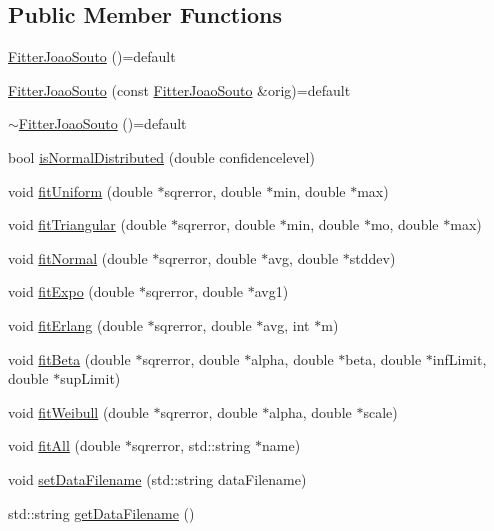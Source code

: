 \subsection*{Public Member Functions}
\begin{DoxyCompactItemize}
\item 
\hyperlink{class_fitter_joao_souto_a30255d1f0611a9fdf64f64d15fd1be5a}{Fitter\-Joao\-Souto} ()=default
\item 
\hyperlink{class_fitter_joao_souto_a82e673f80988f863f01e5eef8a2c95cb}{Fitter\-Joao\-Souto} (const \hyperlink{class_fitter_joao_souto}{Fitter\-Joao\-Souto} \&orig)=default
\item 
\hyperlink{class_fitter_joao_souto_a3956ef306f13b3cc912d3f69960729c9}{$\sim$\-Fitter\-Joao\-Souto} ()=default
\item 
bool \hyperlink{class_fitter_joao_souto_a653081d38fc10cfcd9e8f5bb7ff81e9a}{is\-Normal\-Distributed} (double confidencelevel)
\item 
void \hyperlink{class_fitter_joao_souto_ae22eb8c3c56c8b1253261652ae5ad152}{fit\-Uniform} (double $\ast$sqrerror, double $\ast$min, double $\ast$max)
\item 
void \hyperlink{class_fitter_joao_souto_a3cea6d756de4931b2b395e49b29230c9}{fit\-Triangular} (double $\ast$sqrerror, double $\ast$min, double $\ast$mo, double $\ast$max)
\item 
void \hyperlink{class_fitter_joao_souto_a7ca82959fcf03884eaeac57367a04959}{fit\-Normal} (double $\ast$sqrerror, double $\ast$avg, double $\ast$stddev)
\item 
void \hyperlink{class_fitter_joao_souto_a212f66a0787f7dd007675d3160428f2e}{fit\-Expo} (double $\ast$sqrerror, double $\ast$avg1)
\item 
void \hyperlink{class_fitter_joao_souto_a0fa377ecaf5240192875db081268c1f2}{fit\-Erlang} (double $\ast$sqrerror, double $\ast$avg, int $\ast$m)
\item 
void \hyperlink{class_fitter_joao_souto_a9ab8de1bbf179c05e57e54ec101a0b1a}{fit\-Beta} (double $\ast$sqrerror, double $\ast$alpha, double $\ast$beta, double $\ast$inf\-Limit, double $\ast$sup\-Limit)
\item 
void \hyperlink{class_fitter_joao_souto_a4a3175a5d6d8c96baf2658e5f7837d99}{fit\-Weibull} (double $\ast$sqrerror, double $\ast$alpha, double $\ast$scale)
\item 
void \hyperlink{class_fitter_joao_souto_a83e95985c9bc5d419803b12a572ac743}{fit\-All} (double $\ast$sqrerror, std\-::string $\ast$name)
\item 
void \hyperlink{class_fitter_joao_souto_a9ec6f95ed55dbc1f6385a24c48bd92b9}{set\-Data\-Filename} (std\-::string data\-Filename)
\item 
std\-::string \hyperlink{class_fitter_joao_souto_a38d3a9322091a1ecacb0c520bf178797}{get\-Data\-Filename} ()
\end{DoxyCompactItemize}


